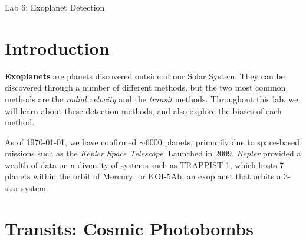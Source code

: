 \documentclass[12pt]{article}
\begin{document}
\thispagestyle{empty}
 \begin{center}
\huge{Lab 6: Exoplanet Detection} \medskip\\
\end{center} 

\section{Introduction}

\textbf{Exoplanets} are planets discovered outside of our Solar System. They can be discovered through a number of different methods, but the two most common methods are the \textit{radial velocity} and the \textit{transit} methods. Throughout this lab, we will learn about these detection methods, and also explore the biases of each method.

As of \today, we have confirmed $\sim$6000 planets, primarily due to space-based missions such as the \textit{Kepler Space Telescope}. Launched in 2009, \textit{Kepler} provided a wealth of data on a diversity of systems such as TRAPPIST-1, which hosts 7 planets within the orbit of Mercury; or KOI-5Ab, an exoplanet that orbits a 3-star system. 






\section{Transits: Cosmic Photobombs}
\end{document}
